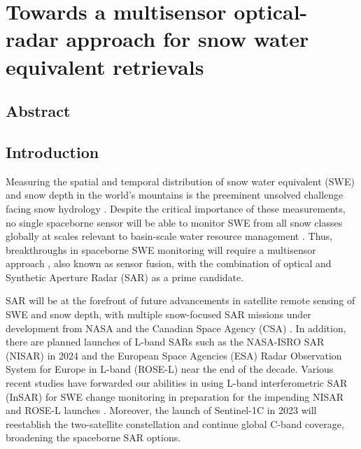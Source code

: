 \hypertarget{ch4}{%
\chapter{Towards a multisensor optical-radar approach for snow water equivalent retrievals}\label{ch4}}


\hypertarget{ch4-abstract}{\section{Abstract}\label{ch4-abstract}}


\hypertarget{ch4-intro}{\section{Introduction}\label{ch4-intro}}



Measuring the spatial and temporal distribution of snow water equivalent (SWE) and snow depth in the world’s mountains is the preeminent unsolved challenge facing snow hydrology \citep{dozierEstimatingSpatialDistribution2016}. Despite the critical importance of these measurements, no single spaceborne sensor will be able to monitor SWE from all snow classes \citep{sturmSeasonalSnowCover1995, sturmRevisitingGlobalSeasonal2021} globally at scales relevant to basin-scale water resource management \citep{lettenmaierInroadsRemoteSensing2015}. Thus, breakthroughs in spaceborne SWE monitoring will require a multisensor approach \citep{durandAchievingBreakthroughsGlobal2021}, also known as sensor fusion, with the combination of optical and Synthetic Aperture Radar (SAR) as a prime candidate. 

SAR will be at the forefront of future advancements in satellite remote sensing of SWE and snow depth, with multiple snow-focused SAR missions under development from NASA and the Canadian Space Agency (CSA) \citep{tsangReviewArticleGlobal2022, yuehSatelliteSyntheticAperture2021, garnaudQuantifyingSnowMass2019}. In addition, there are planned launches of L-band SARs such as the NASA-ISRO SAR (NISAR) in 2024 and the European Space Agencies (ESA) Radar Observation System for Europe in L-band (ROSE-L) near the end of the decade. Various recent studies have forwarded our abilities in using L-band interferometric SAR (InSAR) for SWE change monitoring in preparation for the impending NISAR and ROSE-L launches \citep{tarriconeEstimatingSnowAccumulation2023a, marshallLBandInSARDepth2021, naglerAirborneExperimentInsar2022}. Moreover, the launch of Sentinel-1C in 2023 will reestablish the two-satellite constellation and continue global C-band coverage, broadening the spaceborne SAR options. 

